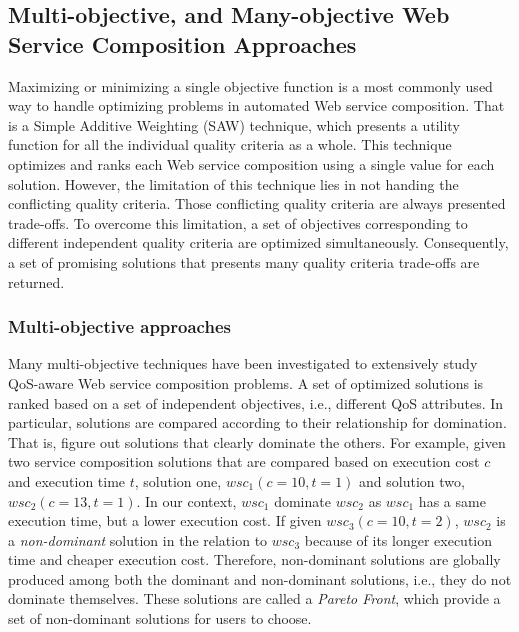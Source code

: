 \subsection{Multi-objective, and Many-objective Web Service Composition Approaches}\label{multiobjective}
Maximizing or minimizing a single objective function is a most commonly used way to handle optimizing problems in automated Web service composition.  That is a Simple Additive Weighting (SAW) \cite{hwang1981lecture} technique, which presents a utility function for all the individual quality criteria as a whole. This technique optimizes and ranks each Web service composition using a single value for each solution. However,  the limitation of this technique lies in not handing the conflicting quality criteria.  Those conflicting quality criteria are always presented trade-offs. To overcome this limitation, a set of objectives corresponding to different independent quality criteria are optimized simultaneously. Consequently,  a set of promising solutions that presents many quality criteria trade-offs are returned.


\subsubsection{Multi-objective approaches}\label{MultiObjective}

Many multi-objective techniques \cite{liu2005dynamic,zhang2010qos,yu2013efficient,yin2014hybrid,xiang2014qos,chen2014partial} have been investigated to extensively study QoS-aware Web service composition problems.  A set of optimized solutions is ranked based on a set of independent objectives, i.e., different QoS attributes. In particular, solutions are compared according to their relationship for domination. That is, figure out solutions that clearly dominate the others. For example, given two service composition solutions that are compared based on execution cost $c$ and execution time $t$, solution one, $wsc_1(c=10,t=1)$ and solution two,  $wsc_2(c=13,t=1)$. In our context, $wsc_1$ dominate $wsc_2$ as $wsc_1$ has a same execution time, but a lower execution cost. If given $wsc_3(c=10,t=2)$, $wsc_2$ is a \textit{non-dominant} solution in the relation to $wsc_3$ because of its longer execution time and cheaper execution cost. Therefore, non-dominant solutions are globally produced among both the dominant and non-dominant solutions, i.e., they do not dominate themselves. These solutions are called a \textit{Pareto Front}, which provide a set of non-dominant solutions for users to choose.


